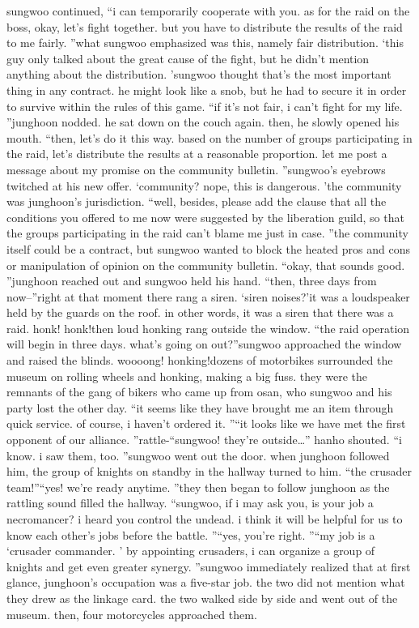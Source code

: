 sungwoo continued, “i can temporarily cooperate with you.
 as for the raid on the boss, okay, let’s fight together.
 but you have to distribute the results of the raid to me fairly.
”what sungwoo emphasized was this, namely fair distribution.
‘this guy only talked about the great cause of the fight, but he didn’t mention anything about the distribution.
’sungwoo thought that’s the most important thing in any contract.
 he might look like a snob, but he had to secure it in order to survive within the rules of this game.
“if it’s not fair, i can’t fight for my life.
”junghoon nodded.
 he sat down on the couch again.
 then, he slowly opened his mouth.
“then, let’s do it this way.
 based on the number of groups participating in the raid, let’s distribute the results at a reasonable proportion.
 let me post a message about my promise on the community bulletin.
”sungwoo’s eyebrows twitched at his new offer.
‘community? nope, this is dangerous.
’the community was junghoon’s jurisdiction.
“well, besides, please add the clause that all the conditions you offered to me now were suggested by the liberation guild, so that the groups participating in the raid can’t blame me just in case.
”the community itself could be a contract, but sungwoo wanted to block the heated pros and cons or manipulation of opinion on the community bulletin.
“okay, that sounds good.
”junghoon reached out and sungwoo held his hand.
“then, three days from now–”right at that moment there rang a siren.
‘siren noises?’it was a loudspeaker held by the guards on the roof.
 in other words, it was a siren that there was a raid.
honk! honk!then loud honking rang outside the window.
“the raid operation will begin in three days.
 what’s going on out?”sungwoo approached the window and raised the blinds.
woooong! honking!dozens of motorbikes surrounded the museum on rolling wheels and honking, making a big fuss.
they were the remnants of the gang of bikers who came up from osan, who sungwoo and his party lost the other day.
“it seems like they have brought me an item through quick service.
 of course, i haven’t ordered it.
”“it looks like we have met the first opponent of our alliance.
”rattle-“sungwoo! they’re outside…” hanho shouted.
“i know.
 i saw them, too.
”sungwoo went out the door.
 when junghoon followed him, the group of knights on standby in the hallway turned to him.
“the crusader team!”“yes! we’re ready anytime.
”they then began to follow junghoon as the rattling sound filled the hallway.
“sungwoo, if i may ask you, is your job a necromancer? i heard you control the undead.
 i think it will be helpful for us to know each other’s jobs before the battle.
”“yes, you’re right.
”“my job is a ‘crusader commander.
’ by appointing crusaders, i can organize a group of knights and get even greater synergy.
”sungwoo immediately realized that at first glance, junghoon’s occupation was a five-star job.
 the two did not mention what they drew as the linkage card.
the two walked side by side and went out of the museum.
 then, four motorcycles approached them.


